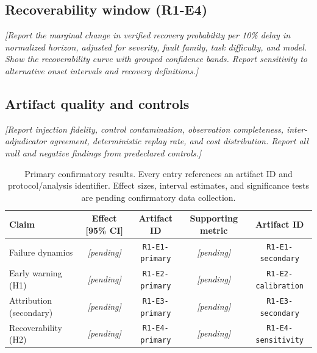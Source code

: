 \subsection{Recoverability window (R1-E4)}

\textit{[Report the marginal change in verified recovery probability per
10\% delay in normalized horizon, adjusted for severity, fault family,
task difficulty, and model. Show the recoverability curve with grouped
confidence bands. Report sensitivity to alternative onset intervals and
recovery definitions.]}

\subsection{Artifact quality and controls}

\textit{[Report injection fidelity, control contamination, observation
completeness, inter-adjudicator agreement, deterministic replay rate,
and cost distribution. Report all null and negative findings from
predeclared controls.]}

\begin{table}[t]
\centering
\caption{Primary confirmatory results. Every entry references an artifact
ID and protocol/analysis identifier. Effect sizes, interval estimates, and
significance tests are pending confirmatory data collection.}
\label{tab:primary_results}
\begin{tabular}{lcccc}
\toprule
\textbf{Claim} & \textbf{Effect [95\% CI]} & \textbf{Artifact ID} & \textbf{Supporting metric} & \textbf{Artifact ID} \\
\midrule
Failure dynamics & \textit{[pending]} & \texttt{R1-E1-primary} &
  \textit{[pending]} & \texttt{R1-E1-secondary} \\
Early warning (H1) & \textit{[pending]} & \texttt{R1-E2-primary} &
  \textit{[pending]} & \texttt{R1-E2-calibration} \\
Attribution (secondary) & \textit{[pending]} & \texttt{R1-E3-primary} &
  \textit{[pending]} & \texttt{R1-E3-secondary} \\
Recoverability (H2) & \textit{[pending]} & \texttt{R1-E4-primary} &
  \textit{[pending]} & \texttt{R1-E4-sensitivity} \\
\bottomrule
\end{tabular}
\end{table}

